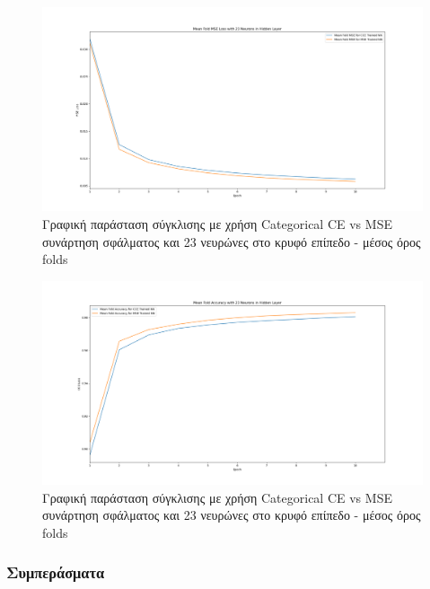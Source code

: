 \documentclass[12pt,a4paper]{article}
\begin{document}
\begin{figure}[H]
	\includegraphics[width=\textwidth]{Screenshots/17. CCE vs MSE - MSE Loss - 23 Neurons - Mean.png}
	\caption{Γραφική παράσταση σύγκλισης με χρήση Categorical CE vs MSE συνάρτηση σφάλματος και 23 νευρώνες στο κρυφό επίπεδο - μέσος όρος folds}
\end{figure}

\begin{figure}[H]
	\includegraphics[width=\textwidth]{Screenshots/18. CCE vs MSE - Accuracy - 23 Neurons - Mean.png}
	\caption{Γραφική παράσταση σύγκλισης με χρήση Categorical CE vs MSE συνάρτηση σφάλματος και 23 νευρώνες στο κρυφό επίπεδο - μέσος όρος folds}
\end{figure}

\subsubsection{Συμπεράσματα}
\end{document}
